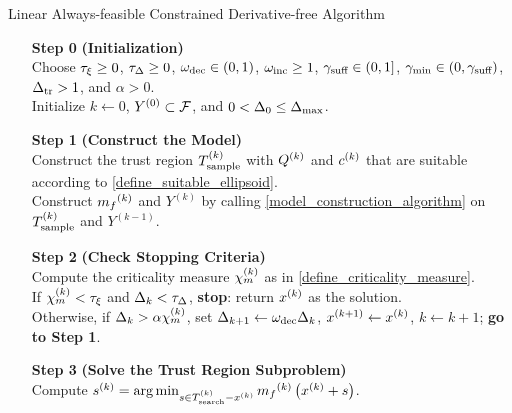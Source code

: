 \documentclass{article}
\begin{document}
{
\begin{fullwidth}[leftmargin=0in, rightmargin=0in, width=\linewidth-0.5in]
\begin{flushleft}

\begin{algorithm}[H]
    \caption{Linear Always-feasible Constrained Derivative-free Algorithm}
    \label{linearly_constrained_dfo_simple}
    \begin{itemize}
        \item[\textbf{Step 0}] \textbf{(Initialization)} \\
            Choose
            $\tau_{\xi}\ge 0$,
            $\tau_{\Delta} \ge 0$, 
            $\omega_{\text{dec}} \in (0,1)$, 
            $\omega_{\text{inc}} \ge 1$,  
            $ \gamma_{\textrm{suff}} \in (0,1]$, 
            $\gamma_{\textrm{min}} \in (0,\gamma_{\textrm{suff}})$,
            $\Delta_{\textrm{tr}} > 1$,
			and $\alpha > 0$. \\
            Initialize
            $k\gets 0$,
            $Y^{(0)} \subset {\mathcal F}$,
            and $0 < \Delta_0 \le {\Delta_{\textrm{max}}}$.
            
        \item[\textbf{Step 1}] \textbf{(Construct the Model)} \\
           Construct the trust region ${T_{\text{sample}}^{(k)}}$ with ${Q^{(k)}}$ and $c^{(k)}$ that are suitable according to \cref{define_suitable_ellipsoid}. \\
           Construct ${{m}_f}^{(k)}$ and $Y^{(k)}$ by calling \cref{model_construction_algorithm} on ${T_{\text{sample}}^{(k)}}$ and $Y^{(k-1)}$.   
        
        \item[\textbf{Step 2}] \textbf{(Check Stopping Criteria)} \\
            Compute the criticality measure ${\chi_m^{(k)}}$ as in \cref{define_criticality_measure}. \\
            If $ {\chi_m^{(k)}} < \tau_{\xi} $ and $\Delta_k <\tau_{\Delta}$,  {\bf stop}: return $x^{(k)}$ as the solution.   \\
            Otherwise, if $\Delta_k > \alpha {\chi_m^{(k)}}$,   
            set 
                $\Delta_{k+1} \gets \omega_{\text{dec}}\Delta_k$, 
                ${{x}^{(k+1)}} \gets x^{(k)}$,
                $k \gets k+1$; {\bf go to Step 1}.
           
        
        \item[\textbf{Step 3}] \textbf{(Solve the Trust Region Subproblem)} \\
            Compute ${{s}^{(k)}} = \operatorname*{arg\,min}_{s \in {T_{\text{search}}^{(k)}} - x^{(k)}} {{m}_f}^{(k)}\left(x^{(k)} + s\right)$. 
            

\end{itemize}
\end{algorithm}
\end{flushleft}
\end{fullwidth}}
\end{document}

